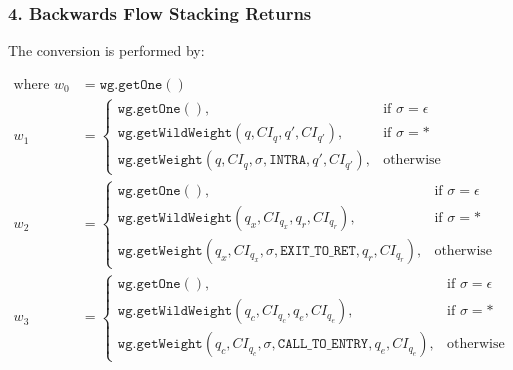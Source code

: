 \subsubsection{4. Backwards Flow Stacking Returns}

\noindent The conversion is performed by:

\begin{changebar}

\begin{align*}
\text{where }
w_0 &= \mathtt{wg.getOne}() \\
w_1 &= \begin{cases}
           \mathtt{wg.getOne}(), & \text{if } \sigma = \epsilon \\
           \mathtt{wg.getWildWeight}(q,CI_q,q',CI_{q'}), & \text{if } \sigma = \text{*} \\
           \mathtt{wg.getWeight}(q,CI_q,\sigma, \mathtt{INTRA},q',CI_{q'}), & \text{otherwise}
       \end{cases} \\
w_2 &= \begin{cases}
          \mathtt{wg.getOne}(), & \text{if } \sigma = \epsilon \\
          \mathtt{wg.getWildWeight}(q_x,CI_{q_x},q_r,CI_{q_r}), & \text{if } \sigma = \text{*} \\
          \mathtt{wg.getWeight}(q_x,CI_{q_x},\sigma, \mathtt{EXIT\_TO\_RET},q_r,CI_{q_r}), & \text{otherwise}
      \end{cases} \\
w_3 &= \begin{cases}
           \mathtt{wg.getOne}(), & \text{if } \sigma = \epsilon \\
           \mathtt{wg.getWildWeight}(q_c,CI_{q_c},q_e,CI_{q_e}), & \text{if } \sigma = \text{*} \\
           \mathtt{wg.getWeight}(q_c,CI_{q_c},\sigma, \mathtt{CALL\_TO\_ENTRY},q_e,CI_{q_e}), & \text{otherwise}
      \end{cases} 
\end{align*}

\end{changebar}

